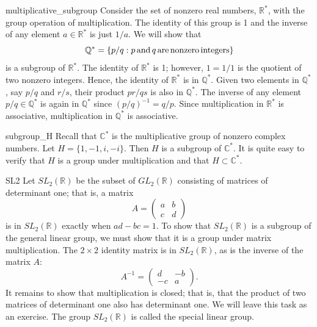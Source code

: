  
\begin{example}{multiplicative_subgroup}
Consider the set of nonzero real numbers, ${\mathbb
R}^*$,\label{noteRstar}  with the group operation of multiplication.
The identity of this group is 1 and the inverse of any element $a \in
{\mathbb R}^*$ is just $1/a$. We will  show  that
\[
{\mathbb Q}^*\label{noteQstar} = \{ p/q : p \, {\rm
and }\, q\, {\rm are\, nonzero\, integers} \}
\]
is a subgroup of ${\mathbb R}^*$. The identity of ${\mathbb R}^*$ is 1;
however,  $1 = 1/1$ is the quotient of two nonzero integers. Hence,
the identity of ${\mathbb R}^*$ is in ${\mathbb Q}^*$. Given two elements in
${\mathbb Q}^*$, say $p/q$ and $r/s$, their product $pr/qs$ is also in
${\mathbb Q}^*$. The inverse of any element $p/q \in {\mathbb Q}^*$ is again
in ${\mathbb Q}^*$ since $(p/q)^{-1} = q/p$. Since multiplication in
${\mathbb R}^*$ is associative, multiplication in ${\mathbb Q}^*$ is
associative. 
\end{example}
 
 
\begin{example}{subgroup_H}
Recall that ${\mathbb C}^{\ast}$  is the multiplicative group of nonzero
complex numbers. Let $H = \{ 1, -1, i, -i \}$. Then $H$ is a subgroup
of ${\mathbb C}^{\ast}$. It is quite easy to verify  that $H$ is a group
under multiplication and that $H \subset {\mathbb C}^{\ast}$. 
\end{example}
 
 
\begin{example}{SL2}
Let $SL_2( {\mathbb R})$\label{speciallinear} be the subset of $GL_2( {\mathbb R })$
consisting of matrices of determinant one; that is, a matrix
\[
A =
\begin{pmatrix}
a & b \\
c & d
\end{pmatrix}
\]
is in $SL_2( {\mathbb R})$ exactly when $ad - bc = 1$. To show that
$SL_2( {\mathbb R})$ is a subgroup of the general linear group, we must
show that it is a group under matrix multiplication.  The $2 \times 2$
identity matrix is in $SL_2( {\mathbb R})$, as is the inverse of the
matrix $A$:  
\[
A^{-1} =
\begin{pmatrix}
d  & -b \\
-c &  a
\end{pmatrix}.
\]
It remains to show that multiplication is closed; that is, that the
product of two matrices of determinant one also has determinant one.
We will leave this task as an exercise. The group $SL_2({\mathbb R})$ is
called the {\bfi special linear group}.
\end{example}
 
